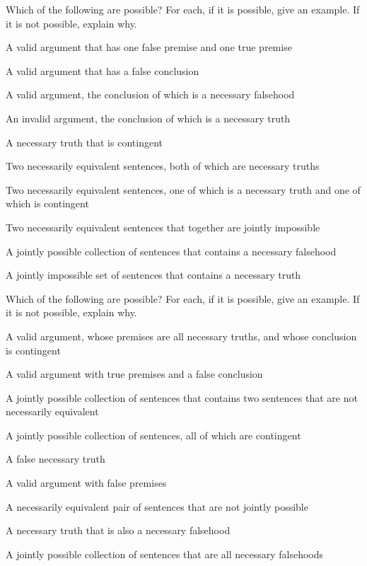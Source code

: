 \problempart
\label{pr.EnglishCombinations2}
Which of the following are possible? For each, if it is possible, give an example. If it is not possible, explain why.
\begin{compactlist}
\item A valid argument that has one false premise and one true premise

\item A valid argument that has a false conclusion

\item A valid argument, the conclusion of which is a necessary falsehood

\item An invalid argument, the conclusion of which is a necessary truth

\item A necessary truth that is contingent

\item Two necessarily equivalent sentences, both of which are necessary truths

\item Two necessarily equivalent sentences, one of which is a necessary truth and one of which is contingent

\item Two necessarily equivalent sentences that together are jointly impossible

\item A jointly possible collection of sentences that contains a necessary falsehood

\item A jointly impossible set of sentences that contains a necessary truth
\end{compactlist}

\problempart
Which of the following are possible? For each, if it is possible, give an example. If it is not possible, explain why.

\begin{compactlist}
\item A valid argument, whose premises are all necessary truths, and whose conclusion is contingent
\item A valid argument with true premises and a false conclusion
\item A jointly possible collection of sentences that contains two sentences that are not necessarily equivalent
\item A jointly possible collection of sentences, all of which are contingent
\item A false necessary truth
\item A valid argument with false premises
\item A necessarily equivalent pair of sentences that are not jointly possible
\item A necessary truth that is also a necessary falsehood
\item A jointly possible collection of sentences that are all necessary falsehoods
\end{compactlist}
